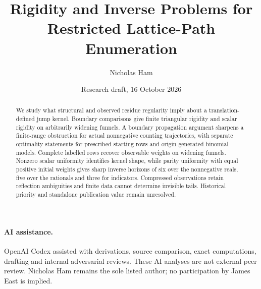 \documentclass[11pt]{article}
\title{Rigidity and Inverse Problems for Restricted Lattice-Path Enumeration}
\author{Nicholas Ham}
\date{Research draft, 16 October 2026}
\begin{document}
\maketitle
\begin{abstract}
We study what structural and observed residue regularity imply about a translation-defined jump kernel. Boundary comparisons give finite triangular rigidity and scalar rigidity on arbitrarily widening funnels. A boundary propagation argument sharpens a finite-range obstruction for actual nonnegative counting trajectories, with separate optimality statements for prescribed starting rows and origin-generated binomial models. Complete labelled rows recover observable weights on widening funnels. Nonzero scalar uniformity identifies kernel shape, while parity uniformity with equal positive initial weights gives sharp inverse horizons of six over the nonnegative reals, five over the rationals and three for indicators. Compressed observations retain reflection ambiguities and finite data cannot determine invisible tails. Historical priority and standalone publication value remain unresolved.
\end{abstract}







\paragraph{AI assistance.} OpenAI Codex assisted with derivations, source comparison, exact computations, drafting and internal adversarial reviews. These AI analyses are not external peer review. Nicholas Ham remains the sole listed author; no participation by James East is implied.


\end{document}
